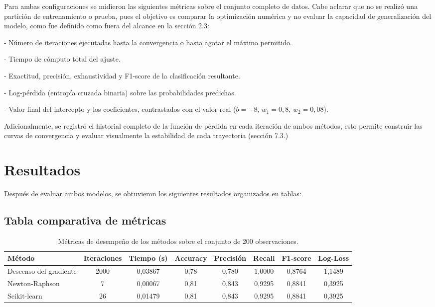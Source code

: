 Para ambas configuraciones se midieron las siguientes métricas sobre el conjunto completo de datos. Cabe aclarar que no se realizó una partición de entrenamiento o prueba, pues el objetivo es comparar la optimización numérica y no evaluar la capacidad de generalización del modelo, como fue definido como fuera del alcance en la sección 2.3:

- Número de iteraciones ejecutadas hasta la convergencia o hasta agotar el máximo permitido.

- Tiempo de cómputo total del ajuste.

- Exactitud, precisión, exhaustividad y F1-score de la clasificación resultante.

- Log-pérdida (entropía cruzada binaria) sobre las probabilidades predichas.

- Valor final del intercepto y los coeficientes, contrastados con el valor real ($b=-8$, $w_1 = 0,8$, $w_2 = 0,08$).

Adicionalmente, se registró el historial completo de la función de pérdida en cada iteración de ambos métodos, esto permite construir las curvas de convergencia y evaluar visualmente la estabilidad de cada trayectoria (sección 7.3.)

\section{Resultados}

Después de evaluar ambos modelos, se obtuvieron los siguientes resultados organizados en tablas:

\subsection{Tabla comparativa de métricas}
\begin{table}[H]
\centering
\begin{tabular}{|l|c|c|c|c|c|c|c|}
\hline
\textbf{Método} & \textbf{Iteraciones} & \textbf{Tiempo (s)} & \textbf{Accuracy} & \textbf{Precisión} & \textbf{Recall} & \textbf{F1-score} & \textbf{Log-Loss} \\
\hline
Descenso del gradiente & 2000 & 0,03867 & 0,78 & 0,780 & 1,0000 & 0,8764 & 1,1489 \\
Newton-Raphson & 7 & 0,00067 & 0,81 & 0,843 & 0,9295 & 0,8841 & 0,3925 \\
Scikit-learn & 26 & 0,01479 & 0,81 & 0,843 & 0,9295 & 0,8841 & 0,3925 \\
\hline
\end{tabular}
\caption{Métricas de desempeño de los métodos sobre el conjunto de 200 observaciones.}
\end{table}
